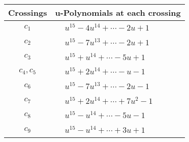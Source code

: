 \documentclass[1p]{elsarticle_modified}
\theoremstyle{definition}
\begin{document}
\begin{tabular}{m{50pt}|m{274pt}}
Crossings & \hspace{64pt}u-Polynomials at each crossing \\
\hline $$\begin{aligned}c_{1}\end{aligned}$$&$\begin{aligned}
&u^{15}-4 u^{14}+\cdots-2 u+1
\end{aligned}$\\
\hline $$\begin{aligned}c_{2}\end{aligned}$$&$\begin{aligned}
&u^{15}-7 u^{13}+\cdots-2 u+1
\end{aligned}$\\
\hline $$\begin{aligned}c_{3}\end{aligned}$$&$\begin{aligned}
&u^{15}+u^{14}+\cdots-5 u+1
\end{aligned}$\\
\hline $$\begin{aligned}c_{4},c_{5}\end{aligned}$$&$\begin{aligned}
&u^{15}+2 u^{14}+\cdots- u-1
\end{aligned}$\\
\hline $$\begin{aligned}c_{6}\end{aligned}$$&$\begin{aligned}
&u^{15}-7 u^{13}+\cdots-2 u-1
\end{aligned}$\\
\hline $$\begin{aligned}c_{7}\end{aligned}$$&$\begin{aligned}
&u^{15}+2 u^{14}+\cdots+7 u^2-1
\end{aligned}$\\
\hline $$\begin{aligned}c_{8}\end{aligned}$$&$\begin{aligned}
&u^{15}- u^{14}+\cdots-5 u-1
\end{aligned}$\\
\hline $$\begin{aligned}c_{9}\end{aligned}$$&$\begin{aligned}
&u^{15}- u^{14}+\cdots+3 u+1
\end{aligned}$\\

\end{tabular}
\end{document}
